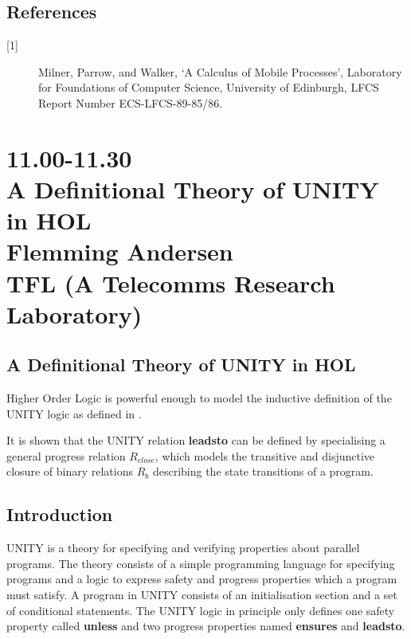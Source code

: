 \subsection*{References}

\begin{description}
\item[{[1]}] Milner, Parrow, and Walker, 
`A Calculus of Mobile Processes', 
Laboratory for Foundations of Computer Science, 
University of Edinburgh, LFCS Report Number ECS-LFCS-89-85/86.
\end{description}

\newpage
\section*{11.00-11.30\\
A Definitional Theory of UNITY in HOL\\
Flemming Andersen \\
\large\bf TFL (A Telecomms Research Laboratory)}

\newcommand{\cnd}{\mbox{ \ \hspace{2mm}}}

\newcommand {\nl} {\begin{tabbing}\end{tabbing}}



\subsection*{A Definitional Theory of UNITY in HOL}

Higher Order Logic is powerful enough to model the inductive definition of the
UNITY logic as defined in \cite{CM88}.

\bigskip
It is shown that the UNITY relation {\bf leadsto} can be defined by
specialising a general progress relation $R_{close}$, which models the
transitive and disjunctive closure of binary relations $R_b$ describing the
state transitions of a program.

\subsection*{Introduction}

UNITY is a theory for specifying and verifying properties about parallel
programs. The theory consists of a simple programming language for specifying
programs and a logic to express safety and progress properties which a program
must satisfy. A program in UNITY consists of an initialisation section and a
set of conditional statements. The UNITY logic in principle only defines one
safety property called {\bf unless} and two progress properties named {\bf
ensures} and {\bf leadsto}. 

